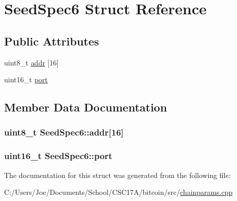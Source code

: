 \hypertarget{struct_seed_spec6}{}\section{Seed\+Spec6 Struct Reference}
\label{struct_seed_spec6}
\subsection*{Public Attributes}
\begin{DoxyCompactItemize}
\item 
uint8\+\_\+t \hyperlink{struct_seed_spec6_ad08d58f6fcd19c2bdb1e24cde0791cbc}{addr} \mbox{[}16\mbox{]}
\item 
uint16\+\_\+t \hyperlink{struct_seed_spec6_a48fdfc3ed14e7676b500bab2e2bcc643}{port}
\end{DoxyCompactItemize}


\subsection{Member Data Documentation}
\hypertarget{struct_seed_spec6_ad08d58f6fcd19c2bdb1e24cde0791cbc}{}
\subsubsection[{addr}]{\setlength{\rightskip}{0pt plus 5cm}uint8\+\_\+t Seed\+Spec6\+::addr\mbox{[}16\mbox{]}}\label{struct_seed_spec6_ad08d58f6fcd19c2bdb1e24cde0791cbc}
\hypertarget{struct_seed_spec6_a48fdfc3ed14e7676b500bab2e2bcc643}{}
\subsubsection[{port}]{\setlength{\rightskip}{0pt plus 5cm}uint16\+\_\+t Seed\+Spec6\+::port}\label{struct_seed_spec6_a48fdfc3ed14e7676b500bab2e2bcc643}


The documentation for this struct was generated from the following file\+:\begin{DoxyCompactItemize}
\item 
C\+:/\+Users/\+Joe/\+Documents/\+School/\+C\+S\+C17\+A/bitcoin/src/\hyperlink{chainparams_8cpp}{chainparams.\+cpp}\end{DoxyCompactItemize}
